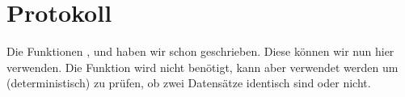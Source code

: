 \clearpage
\section{Protokoll}\label{sec:protokoll}
Die Funktionen ,  und  haben wir schon geschrieben.
Diese können wir nun hier verwenden.
Die Funktion  wird nicht benötigt, kann aber verwendet werden um (deterministisch) zu prüfen, ob zwei Datensätze identisch sind oder nicht.

